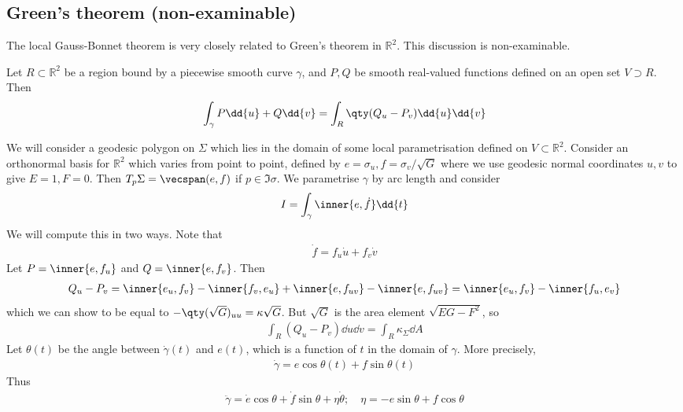 \subsection{Green's theorem (non-examinable)}
The local Gauss-Bonnet theorem is very closely related to Green's theorem in $\mathbb R^2$.
This discussion is non-examinable.
\begin{theorem}
	Let $R \subset \mathbb R^2$ be a region bound by a piecewise smooth curve $\gamma$, and $P, Q$ be smooth real-valued functions defined on an open set $V \supset R$.
	Then
	\begin{align*}
		\int_\gamma P \dd{u}+ Q \dd{v} = \int_R \qty(Q_u - P_v) \dd{u} \dd{v}
	\end{align*}
\end{theorem}
We will consider a geodesic polygon on $\Sigma$ which lies in the domain of some local parametrisation defined on $V \subset \mathbb R^2$.
Consider an orthonormal basis for $\mathbb R^2$ which varies from point to point, defined by $e = \sigma_u, f = \sigma_v/\sqrt{G}$ where we use geodesic normal coordinates $u,v$ to give $E = 1, F = 0$.
Then $T_p \Sigma = \vecspan(e,f)$ if $p \in \Im \sigma$.
We parametrise $\gamma$ by arc length and consider
\begin{align*}
	I = \int_\gamma \inner{e,\dot f} \dd{t}
\end{align*}
We will compute this in two ways.
Note that
\begin{align*}
	\dot f = f_u \dot u + f_v \dot v
\end{align*}
Let $P = \inner{e,f_u}$ and $Q = \inner{e,f_v}$.
Then
\begin{align*}
	Q_u - P_v = \inner{e_u, f_v} - \inner{f_v, e_u} + \inner{e, f_{uv}} - \inner{e, f_{uv}} = \inner{e_u, f_v} - \inner{f_u, e_v}
\end{align*}
which we can show to be equal to $-\qty(\sqrt{G})_{uu} = \kappa \sqrt{G}$.
But $\sqrt{G}$ is the area element $\sqrt{EG-F^2}$, so
\begin{align*}
	\int_R (Q_u - P_v) \dd{u} \dd{v} = \int_R \kappa_\Sigma \dd{A}
\end{align*}
Let $\theta(t)$ be the angle between $\dot\gamma(t)$ and $e(t)$, which is a function of $t$ in the domain of $\gamma$.
More precisely,
\begin{align*}
	\dot \gamma = e \cos \theta(t) + f \sin \theta(t)
\end{align*}
Thus
\begin{align*}
	\ddot \gamma = \dot e \cos \theta + \dot f \sin \theta + \eta \dot \theta;\quad \eta = -e\sin \theta + f \cos \theta
\end{align*}
